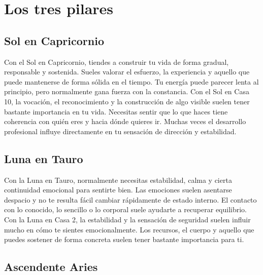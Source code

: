 \documentclass[11pt,a4paper]{article}
\begin{document}
\vspace{0.8cm}


\section{Los tres pilares}

\subsection{Sol en Capricornio}

Con el Sol en Capricornio, tiendes a construir tu vida de forma gradual, responsable y sostenida. Sueles valorar el esfuerzo, la experiencia y aquello que puede mantenerse de forma sólida en el tiempo. Tu energía puede parecer lenta al principio, pero normalmente gana fuerza con la constancia. Con el Sol en Casa 10, la vocación, el reconocimiento y la construcción de algo visible suelen tener bastante importancia en tu vida. Necesitas sentir que lo que haces tiene coherencia con quién eres y hacia dónde quieres ir. Muchas veces el desarrollo profesional influye directamente en tu sensación de dirección y estabilidad.

\vspace{0.8cm}

\subsection{Luna en Tauro}

Con la Luna en Tauro, normalmente necesitas estabilidad, calma y cierta continuidad emocional para sentirte bien. Las emociones suelen asentarse despacio y no te resulta fácil cambiar rápidamente de estado interno. El contacto con lo conocido, lo sencillo o lo corporal suele ayudarte a recuperar equilibrio. Con la Luna en Casa 2, la estabilidad y la sensación de seguridad suelen influir mucho en cómo te sientes emocionalmente. Los recursos, el cuerpo y aquello que puedes sostener de forma concreta suelen tener bastante importancia para ti.

\vspace{0.8cm}

\subsection{Ascendente Aries}
\end{document}
